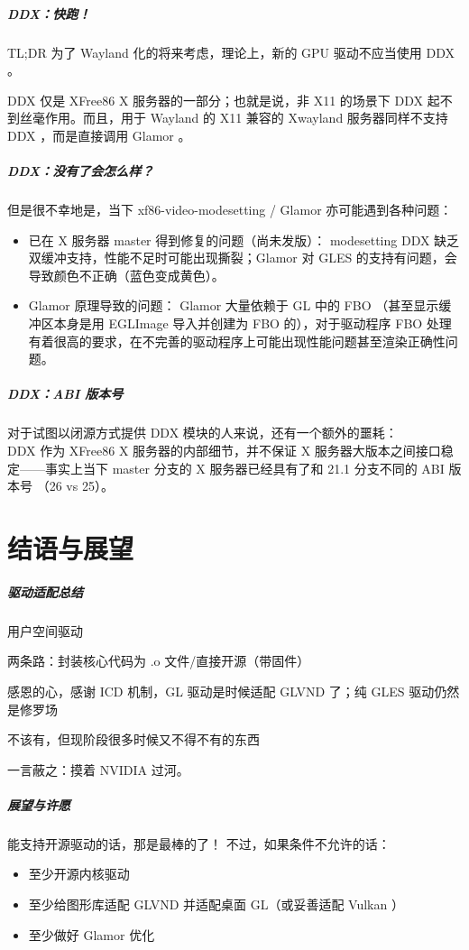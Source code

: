 \documentclass{ctexbeamer}
\begin{document}
\begin{frame}
    \frametitle{DDX：快跑！}
    \begin{alertblock}{TL;DR}
        为了 Wayland 化的将来考虑，理论上，新的 GPU 驱动不应当使用 DDX 。
    \end{alertblock}
    DDX 仅是 XFree86 X 服务器的一部分；也就是说，非 X11 的场景下 DDX 起不到丝毫作用。而且，用于 Wayland 的 X11 兼容的 Xwayland 服务器同样不支持 DDX ，而是直接调用 Glamor 。
\end{frame}

\begin{frame}
    \frametitle{DDX：没有了会怎么样？}
    但是很不幸地是，当下 xf86-video-modesetting / Glamor 亦可能遇到各种问题：
    \begin{itemize}
        \item 已在 X 服务器 master 得到修复的问题（尚未发版）： modesetting DDX 缺乏双缓冲支持，性能不足时可能出现撕裂；Glamor 对 GLES 的支持有问题，会导致颜色不正确（蓝色变成黄色）。
        \item Glamor 原理导致的问题： Glamor 大量依赖于 GL 中的 FBO （甚至显示缓冲区本身是用 EGLImage 导入并创建为 FBO 的），对于驱动程序 FBO 处理有着很高的要求，在不完善的驱动程序上可能出现性能问题甚至渲染正确性问题。
    \end{itemize}
\end{frame}

\begin{frame}
    \frametitle{DDX：ABI 版本号}
    对于试图以闭源方式提供 DDX 模块的人来说，还有一个额外的噩耗：\\
    DDX 作为 XFree86 X 服务器的内部细节，并不保证 X 服务器大版本之间接口稳定——事实上当下 master 分支的 X 服务器已经具有了和 21.1 分支不同的 ABI 版本号 （26 vs 25）。
\end{frame}

\part{结语与展望}
\frame{\partpage}

\begin{frame}
    \frametitle{驱动适配总结}
    \begin{labeling}{用户空间驱动}
        \item [内核驱动] 两条路：封装核心代码为 .o 文件/直接开源（带固件）
        \item [用户空间驱动] 感恩的心，感谢 ICD 机制，GL 驱动是时候适配 GLVND 了；纯 GLES 驱动仍然是修罗场
        \item [DDX] 不该有，但现阶段很多时候又不得不有的东西
    \end{labeling}
    \hfill \break
    一言蔽之：摸着 NVIDIA 过河。
\end{frame}

\begin{frame}
    \frametitle{展望与许愿}
    能支持开源驱动的话，那是最棒的了！
    不过，如果条件不允许的话：
    \begin{itemize}
        \item 至少开源内核驱动
        \item 至少给图形库适配 GLVND 并适配桌面 GL（或妥善适配 Vulkan ）
        \item 至少做好 Glamor 优化
    \end{itemize}
\end{frame}
\end{document}
